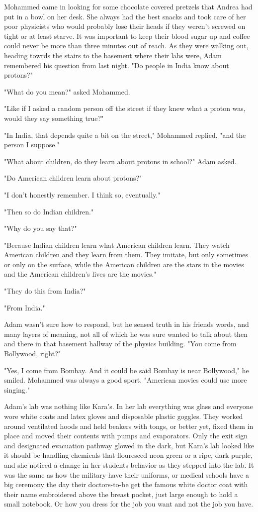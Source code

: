 Mohammed came in looking for some chocolate covered pretzels that Andrea had put in a bowl on her desk. She always had the best snacks and took care of her poor physicists who would probably lose their heads if they weren't screwed on tight or at least starve. It was important to keep their blood sugar up and coffee could never be more than three minutes out of reach. As they were walking out, heading towrds the stairs to the basement where their labs were, Adam remembered his question from last night. "Do people in India know about protons?"

"What do you mean?" asked Mohammed.

"Like if I asked a random person off the street if they knew what a proton was, would they say something true?"

"In India, that depends quite a bit on the street," Mohammed replied, "and the person I suppose."

"What about children, do they learn about protons in school?" Adam asked.

"Do American children learn about protons?"

"I don't honestly remember. I think so, eventually."

"Then so do Indian children."

"Why do you say that?"

"Because Indian children learn what American children learn. They watch American children and they learn from them. They imitate, but only sometimes or only on the surface, while the American children are the stars in the movies and the American children's lives are the movies."

"They do this from India?"

"From India." 

Adam wasn't sure how to respond, but he sensed truth in his friends words, and many layers of meaning, not all of which he was sure wanted to talk about then and there in that basement hallway of the physics building. "You come from Bollywood, right?"

"Yes, I come from Bombay. And it could be said Bombay is near Bollywood," he smiled. Mohammed was always a good sport. "American movies could use more singing."

\mymark

Adam's lab was nothing like Kara's. In her lab everything was glass and everyone wore white coats and latex gloves and disposable plastic goggles. They worked around ventilated hoods and held beakers with tongs, or better yet, fixed them in place and moved their contents with pumps and evaporators. Only the exit sign and designated evacuation pathway glowed in the dark, but Kara's lab looked like it should be handling chemicals that flouresced neon green or a ripe, dark purple, and she noticed a change in her students behavior as they stepped into the lab. It was the same as how the military have their uniforms, or medical schools have a big ceremony the day their doctors-to-be get the famous white doctor coat with their name embroidered above the breast pocket, just large enough to hold a small notebook. Or how you dress for the job you want and not the job you have.

